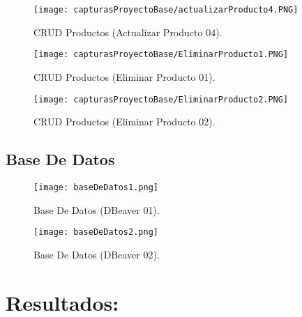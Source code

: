 \documentclass[titlepage, 12pt]{article}
\begin{document}
    \begin{figure}[h]
        \caption{CRUD Productos (Actualizar Producto 04).}
        \centering
        \texttt{[image: capturasProyectoBase/actualizarProducto4.PNG]} \par\vspace{0.5cm}
    \end{figure}
    
    \clearpage
    
    \begin{figure}[h]
        \caption{CRUD Productos (Eliminar Producto 01).}
        \centering
        \texttt{[image: capturasProyectoBase/EliminarProducto1.PNG]} \par\vspace{0.5cm}
    \end{figure}
    
    \begin{figure}[h]
        \caption{CRUD Productos (Eliminar Producto 02).}
        \centering
        \texttt{[image: capturasProyectoBase/EliminarProducto2.PNG]} \par\vspace{0.5cm}
    \end{figure}
    
    \clearpage

\subsection{Base De Datos}
    \begin{figure}[h]
        \caption{Base De Datos (DBeaver 01).}
        \centering
        \texttt{[image: baseDeDatos1.png]} \par\vspace{0.5cm}
    \end{figure}
    
    \begin{figure}[h]
        \caption{Base De Datos (DBeaver 02).}
        \centering
        \texttt{[image: baseDeDatos2.png]} \par\vspace{0.5cm}
    \end{figure}
    
\pagebreak  

\section{Resultados:}
\end{document}
